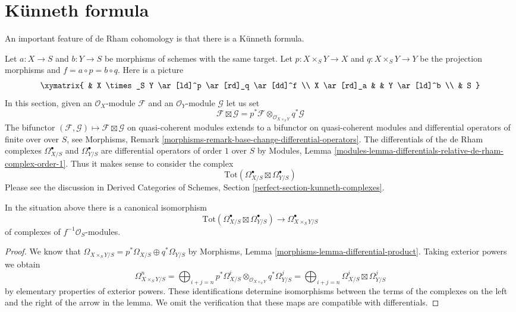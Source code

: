 \section{K\"unneth formula}
\label{section-kunneth}

\noindent
An important feature of de Rham cohomology is that there is a
K\"unneth formula.

\medskip\noindent
Let $a : X \to S$ and $b : Y \to S$ be morphisms of schemes with the same
target. Let $p : X \times_S Y \to X$ and $q : X \times_S Y \to Y$ be the
projection morphisms and $f = a \circ p = b \circ q$. Here is a picture
$$
\xymatrix{
& X \times_S Y \ar[ld]^p \ar[rd]_q \ar[dd]^f \\
X \ar[rd]_a & & Y \ar[ld]^b \\
& S
}
$$
In this section, given an $\mathcal{O}_X$-module $\mathcal{F}$
and an $\mathcal{O}_Y$-module $\mathcal{G}$ let us set
$$
\mathcal{F} \boxtimes \mathcal{G} =
p^*\mathcal{F} \otimes_{\mathcal{O}_{X \times_S Y}} q^*\mathcal{G}
$$
The bifunctor
$(\mathcal{F}, \mathcal{G}) \mapsto \mathcal{F} \boxtimes \mathcal{G}$
on quasi-coherent modules extends to a bifunctor on quasi-coherent modules
and differential operators of finite over over $S$, see
Morphisms, Remark \ref{morphisms-remark-base-change-differential-operators}.
The differentials of the de Rham complexes $\Omega^\bullet_{X/S}$ and
$\Omega^\bullet_{Y/S}$ are differential operators of order $1$
over $S$ by Modules, Lemma
\ref{modules-lemma-differentials-relative-de-rham-complex-order-1}.
Thus it makes sense to consider the complex
$$
\text{Tot}(\Omega^\bullet_{X/S} \boxtimes \Omega^\bullet_{Y/S})
$$
Please see the discussion in Derived Categories of Schemes, Section
\ref{perfect-section-kunneth-complexes}.

\begin{lemma}
\label{lemma-de-rham-complex-product}
In the situation above there is a canonical isomorphism
$$
\text{Tot}(\Omega^\bullet_{X/S} \boxtimes \Omega^\bullet_{Y/S})
\longrightarrow
\Omega^\bullet_{X \times_S Y/S}
$$
of complexes of $f^{-1}\mathcal{O}_S$-modules.
\end{lemma}

\begin{proof}
We know that
$
\Omega_{X \times_S Y/S} = p^*\Omega_{X/S} \oplus q^*\Omega_{Y/S}
$
by Morphisms, Lemma \ref{morphisms-lemma-differential-product}.
Taking exterior powers we obtain
$$
\Omega^n_{X \times_S Y/S} =
\bigoplus\nolimits_{i + j = n}
p^*\Omega^i_{X/S} \otimes_{\mathcal{O}_{X \times_S Y}} q^*\Omega^j_{Y/S} =
\bigoplus\nolimits_{i + j = n}
\Omega^i_{X/S} \boxtimes \Omega^j_{Y/S}
$$
by elementary properties of exterior powers. These identifications determine
isomorphisms between the terms of the complexes on the left and the right
of the arrow in the lemma. We omit the verification that these maps
are compatible with differentials.
\end{proof}

